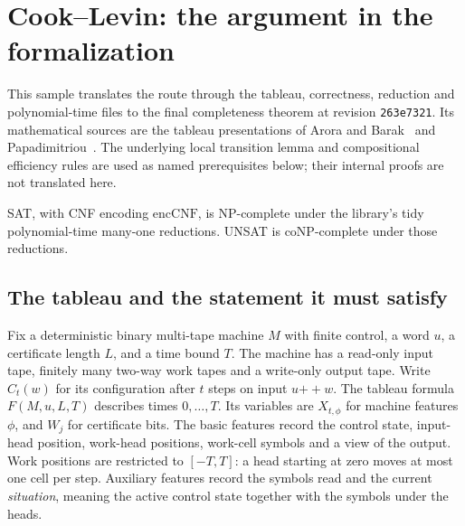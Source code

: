 \section{Cook--Levin: the argument in the formalization}
\label{sec:cook-levin}

This sample translates the route through the tableau, correctness, reduction and
polynomial-time files to the final completeness theorem at revision
\texttt{263e7321}. Its mathematical sources are the tableau presentations of
Arora and Barak~\cite[Section 2.3]{AroraBarak09} and
Papadimitriou~\cite[Theorem 8.2]{Papadimitriou94}.
The underlying local transition lemma and compositional efficiency rules are used as
named prerequisites below; their internal proofs are not translated here.

\begin{theorem}
SAT, with CNF encoding $\mathrm{encCNF}$, is NP-complete under the library's tidy
polynomial-time many-one reductions. UNSAT is coNP-complete under those reductions.
\end{theorem}

\subsection{The tableau and the statement it must satisfy}

Fix a deterministic binary multi-tape machine $M$ with finite control, a word $u$, a certificate length
$L$, and a time bound $T$. The machine has a read-only input tape, finitely many
two-way work tapes and a write-only output tape. Write $C_t(w)$ for its configuration
after $t$ steps on input $u\mathbin{+\!+}w$.
The tableau formula $F(M,u,L,T)$ describes times $0,\ldots,T$.
Its variables are $X_{t,\phi}$ for machine features $\phi$, and $W_j$ for certificate bits.
The basic features record the control state, input-head position, work-head positions,
work-cell symbols and a view of the output. Work positions are restricted to
$[-T,T]$: a head starting at zero moves at most one cell per step.
Auxiliary features record the symbols read and the current \emph{situation}, meaning
the active control state together with the symbols under the heads.

